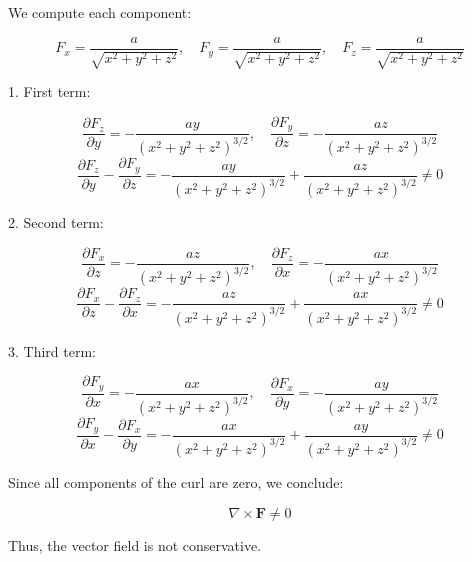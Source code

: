 \documentclass[12pt]{article}
\begin{document}
\begin{enumerate}
    We compute each component:
    
    \[
    F_x = \frac{a}{\sqrt{x^2 + y^2 + z^2}}, \quad F_y = \frac{a}{\sqrt{x^2 + y^2 + z^2}}, \quad F_z = \frac{a}{\sqrt{x^2 + y^2 + z^2}}
    \]
    
    1. First term:
    
    \[
    \frac{\partial F_z}{\partial y} = -\frac{a y}{(x^2 + y^2 + z^2)^{3/2}}, \quad \frac{\partial F_y}{\partial z} = -\frac{a z}{(x^2 + y^2 + z^2)^{3/2}}
    \]
    \[
    \frac{\partial F_z}{\partial y} - \frac{\partial F_y}{\partial z} = -\frac{a y}{(x^2 + y^2 + z^2)^{3/2}} + \frac{a z}{(x^2 + y^2 + z^2)^{3/2}} \neq 0
    \]
    
    2. Second term:
    
    \[
    \frac{\partial F_x}{\partial z} = -\frac{a z}{(x^2 + y^2 + z^2)^{3/2}}, \quad \frac{\partial F_z}{\partial x} = -\frac{a x}{(x^2 + y^2 + z^2)^{3/2}}
    \]
    \[
    \frac{\partial F_x}{\partial z} - \frac{\partial F_z}{\partial x} = -\frac{a z}{(x^2 + y^2 + z^2)^{3/2}} + \frac{a x}{(x^2 + y^2 + z^2)^{3/2}} \neq 0
    \]
    
    3. Third term:
    
    \[
    \frac{\partial F_y}{\partial x} = -\frac{a x}{(x^2 + y^2 + z^2)^{3/2}}, \quad \frac{\partial F_x}{\partial y} = -\frac{a y}{(x^2 + y^2 + z^2)^{3/2}}
    \]
    \[
    \frac{\partial F_y}{\partial x} - \frac{\partial F_x}{\partial y} = -\frac{a x}{(x^2 + y^2 + z^2)^{3/2}} + \frac{a y}{(x^2 + y^2 + z^2)^{3/2}} \neq 0
    \]
    
    Since all components of the curl are zero, we conclude:
    
    \[
    \nabla \times \mathbf{F} \neq 0
    \]
    
    Thus, the vector field is not conservative.
    
    
\end{enumerate}
\end{document}

